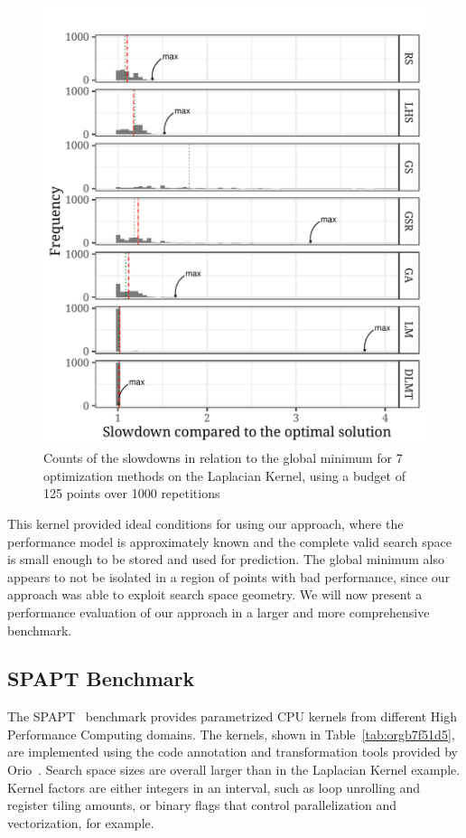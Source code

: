 \documentclass[conference]{IEEEtran}
\begin{document}
\begin{center}
\begin{figure}[ht]
\centering
\includegraphics[width=.9\columnwidth]{./img/comparison_histogram.pdf}
\caption{\label{fig:org14b7388}
Counts of the slowdowns in relation to the global minimum for 7 optimization methods on the Laplacian Kernel, using a budget of 125 points over 1000 repetitions}
\end{figure}
\end{center}

\vspace{-25pt}

This kernel provided ideal conditions for using our approach, where the
performance model is approximately known and the complete valid search space is
small enough to be stored and used for prediction. The global minimum also
appears to not be isolated in a region of points with bad performance, since our
approach was able to exploit search space geometry. We will now present a
performance evaluation of our approach in a larger and more comprehensive
benchmark.
\subsection{SPAPT Benchmark}
\label{sec:orgae296aa}
The SPAPT~\cite{balaprakash2012spapt} benchmark provides parametrized CPU
kernels from different High Performance Computing domains. The kernels, shown in
Table~\ref{tab:orgb7f51d5}, are implemented using the code
annotation and transformation tools provided by
Orio~\cite{hartono2009annotation}. Search space sizes are overall larger
than in the Laplacian Kernel example. Kernel factors are either integers in an
interval, such as loop unrolling and register tiling amounts, or binary flags
that control parallelization and vectorization, for example.
\end{document}
